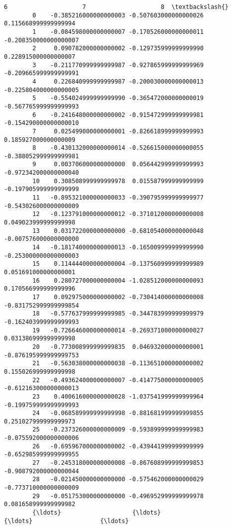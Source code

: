 \documentclass[11pt]{article}
\begin{document}
\begin{Verbatim}[commandchars=\\\{\}]
                                 6                     7                     8  \textbackslash{}
        0    -0.385216000000000003 -0.507603000000000026  0.115668999999999994   
        1    -0.084598000000000007 -0.170526000000000011 -0.208350000000000007   
        2     0.090782000000000002 -0.129735999999999990  0.228915000000000007   
        3    -0.211770999999999987 -0.927865999999999969 -0.209665999999999991   
        4     0.226840999999999987 -0.200030000000000013 -0.225804000000000005   
        5    -0.554024999999999990 -0.365472000000000019 -0.567765999999999993   
        6    -0.241648000000000002 -0.915472999999999981 -0.154290000000000010   
        7     0.025499000000000001 -0.826618999999999993  0.185927000000000009   
        8    -0.430132000000000014 -0.526615000000000055 -0.388052999999999981   
        9     0.003706000000000000  0.056442999999999993 -0.972342000000000040   
        10    0.308508999999999978  0.015587999999999999 -0.197905999999999999   
        11   -0.895321000000000033 -0.390795999999999977 -0.543026000000000009   
        12   -0.123791000000000012 -0.371012000000000008  0.049023999999999998   
        13    0.031722000000000000 -0.681054000000000048 -0.007576000000000000   
        14   -0.181740000000000013 -0.165009999999999990 -0.253000000000000003   
        15    0.114444000000000004 -0.137560999999999989  0.051691000000000001   
        16    0.280727000000000004 -1.028512000000000093  0.170566999999999996   
        17    0.092975000000000002 -0.730414000000000008 -0.831752999999999854   
        18   -0.577637999999999985 -0.344783999999999979 -0.162403999999999993   
        19   -0.726646000000000014 -0.269371000000000027  0.031386999999999998   
        20   -0.773008999999999835  0.046932000000000001 -0.876195999999999753   
        21   -0.563038000000000038 -0.113651000000000002  0.155026999999999998   
        22   -0.493624000000000007 -0.414775000000000005 -0.612163000000000013   
        23    0.400616000000000028 -1.037541999999999964 -0.199759999999999993   
        24   -0.068589999999999998 -0.881681999999999855  0.251027999999999973   
        25   -0.237326000000000009 -0.593899999999999983 -0.075592000000000006   
        26   -0.695967000000000002 -0.439441999999999999 -0.652985999999999955   
        27   -0.245318000000000008 -0.867608999999999853 -0.908792000000000044   
        28   -0.021450000000000000 -0.575462000000000029 -0.773710000000000009   
        29   -0.051753000000000000 -0.496952999999999978  0.081658999999999982   
        {\ldots}                    {\ldots}                   {\ldots}                   {\ldots}   

\end{Verbatim}
\end{document}
